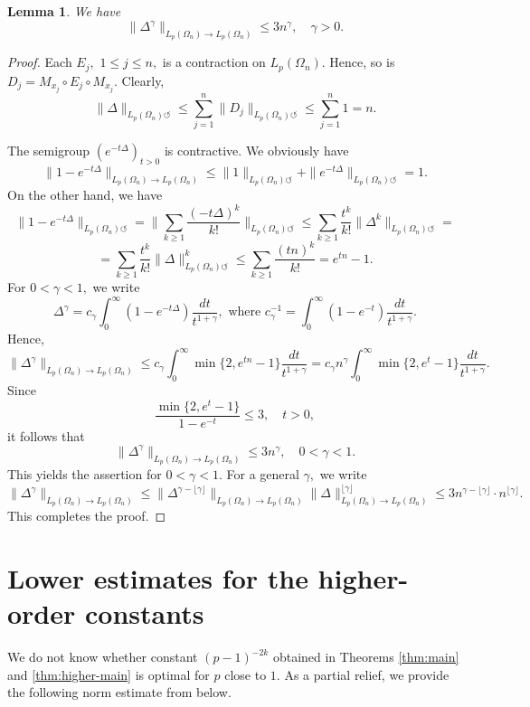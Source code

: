 \documentclass{amsart}
\numberwithin{equation}{section}
\newtheorem{lem}[thm]{Lemma}
\theoremstyle{definition}
\theoremstyle{remark}
\newcommand{\1}{\mathbf 1}
\begin{document}
\begin{lem} We have
$$\|\Delta^{\gamma}\|_{L_p(\Omega_n)\to L_p(\Omega_n)}\leq 3n^{\gamma},\quad \gamma>0.$$
\end{lem}
\begin{proof}  Each $E_j,$ $1\leq j\leq n,$ is a contraction on $L_p(\Omega_n).$ Hence, so is $D_j=M_{x_j}\circ E_j\circ M_{x_j}.$  Clearly,
$$\|\Delta\|_{L_p(\Omega_n)\circlearrowleft}\leq\sum_{j=1}^n\|D_j\|_{L_p(\Omega_n)\circlearrowleft}\leq\sum_{j=1}^n1=n.$$

The semigroup $(e^{-t\Delta})_{t>0}$ is contractive. We obviously have
$$\|1-e^{-t\Delta}\|_{L_p(\Omega_n)\to L_p(\Omega_n)}\leq\|1\|_{L_p(\Omega_n)\circlearrowleft}+\|e^{-t\Delta}\|_{L_p(\Omega_n)\circlearrowleft}=1.$$
On the other hand, we have
$$\|1-e^{-t\Delta}\|_{L_p(\Omega_n)\circlearrowleft}=\|\sum_{k\geq1}\frac{(-t\Delta)^k}{k!}\|_{L_p(\Omega_n)\circlearrowleft}\leq\sum_{k\geq1}\frac{t^k}{k!}\|\Delta^k\|_{L_p(\Omega_n)\circlearrowleft}=$$
$$=\sum_{k\geq1}\frac{t^k}{k!}\|\Delta\|_{L_p(\Omega_n)\circlearrowleft}^k\leq\sum_{k\geq1}\frac{(tn)^k}{k!}=e^{tn}-1.$$
For $0<\gamma<1,$ we write
$$\Delta^{\gamma}=c_{\gamma}\int_0^{\infty}(1-e^{-t\Delta})\frac{dt}{t^{1+\gamma}},\mbox{ where }c_{\gamma}^{-1}=\int_0^{\infty}(1-e^{-t})\frac{dt}{t^{1+\gamma}}.$$
Hence,
$$\|\Delta^{\gamma}\|_{L_p(\Omega_n)\to L_p(\Omega_n)}\leq c_{\gamma}\int_0^{\infty}\min\{2,e^{tn}-1\}\frac{dt}{t^{1+\gamma}}=c_{\gamma}n^{\gamma}\int_0^{\infty}\min\{2,e^t-1\}\frac{dt}{t^{1+\gamma}}.$$
Since
$$\frac{\min\{2,e^t-1\}}{1-e^{-t}}\leq 3,\quad t>0,$$
it follows that
$$\|\Delta^{\gamma}\|_{L_p(\Omega_n)\to L_p(\Omega_n)}\leq 3n^{\gamma},\quad 0<\gamma<1.$$
This yields the assertion for $0<\gamma<1$. For a general $\gamma,$ we write
$$\|\Delta^{\gamma}\|_{L_p(\Omega_n)\to L_p(\Omega_n)}\leq \|\Delta^{\gamma-\lfloor\gamma\rfloor}\|_{L_p(\Omega_n)\to L_p(\Omega_n)}\|\Delta\|_{L_p(\Omega_n)\to L_p(\Omega_n)}^{\lfloor\gamma\rfloor}\leq 3n^{\gamma-\lfloor\gamma\rfloor}\cdot n^{\lfloor \gamma\rfloor}.$$
This completes the proof.
\end{proof}

\section{Lower estimates for the higher-order constants}\label{optimality on constants}

We do not know whether constant $(p-1)^{-2k}$ obtained in Theorems \ref{thm:main} and \ref{thm:higher-main} is optimal for $p$ close to $1.$ As a partial relief, we provide the following norm estimate from below. 
\end{document}

